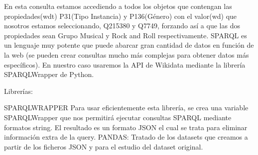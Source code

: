 En esta consulta estamos accediendo a todos los objetos que contengan las propiedades(wdt) P31(Tipo Instancia) y P136(Género) con el valor(wd) que nosotros estamos seleccionando, Q215380 y Q7749, forzando así a que las dos propiedades sean Grupo Musical y Rock and Roll respectivamente.
SPARQL es un lenguaje muy potente que puede abarcar gran cantidad de datos en función de la web (se pueden crear consultas mucho más complejas para obtener datos más específicos). En nuestro caso usaremos la API de Wikidata mediante la librería SPARQLWrapper de Python.

Librerías:

SPARQLWRAPPER
Para usar eficientemente esta librería, se crea una variable SPARQLWrapper que nos permitirá ejecutar consultas SPARQL mediante formatos string.
El resultado es un formato JSON el cual se trata para eliminar información extra de la query.
PANDAS:
Tratado de los datasets que creamos a partir de los ficheros JSON y para el estudio del dataset original.